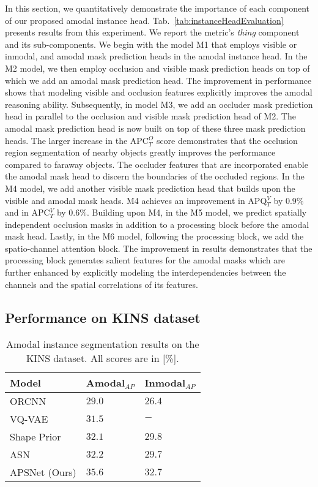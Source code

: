 \documentclass[10pt,twocolumn,letterpaper]{article}
\newcommand{\tabref}[1]{Tab.~\ref{#1}}
\begin{document}
In this section, we quantitatively demonstrate the importance of each component of our proposed amodal instance head. \tabref{tab:instanceHeadEvaluation} presents results from this experiment. We report the metric's \textit{thing} component and its sub-components. We begin with the model M1 that employs visible or inmodal, and amodal mask prediction heads in the amodal instance head. In the M2 model, we then employ occlusion and visible mask prediction heads on top of which we add an amodal mask prediction head. The improvement in performance shows that modeling visible and occlusion features explicitly improves the amodal reasoning ability. Subsequently, in model M3, we add an occluder mask prediction head in parallel to the occlusion and visible mask prediction head of M2. The amodal mask prediction head is now built on top of these three mask prediction heads. The larger increase in the APC$^O_T$ score demonstrates that the occlusion region segmentation of nearby objects greatly improves the performance compared to faraway objects. The occluder features that are incorporated enable the amodal mask head to discern the boundaries of the occluded regions. In the M4 model, we add another visible mask prediction head that builds upon the visible and amodal mask heads. M4 achieves an improvement in APQ$^V_T$ by $0.9\%$ and in APC$^V_T$ by $0.6\%$. Building upon M4, in the M5 model, we predict spatially independent occlusion masks in addition to a processing block before the amodal mask head. Lastly, in the M6 model, following the processing block, we add the spatio-channel attention block. The improvement in results demonstrates that the processing block generates salient features for the amodal masks which are further enhanced by explicitly modeling the interdependencies between the channels and the spatial correlations of its features.

\subsection{Performance on KINS dataset}\label{sec:kins}
\begin{table}
\footnotesize 
\centering
\begin{tabular}{p{2.5cm}|p{1.2cm}p{1.2cm}}
\toprule
Model &  Amodal$_{AP}$ & Inmodal$_{AP}$ \\
\midrule
ORCNN~\cite{follmann2019learning}  & $29.0$ &$26.4$  \\
VQ-VAE~\cite{jang2020learning}  & $31.5$ &$-$  \\
Shape Prior~\cite{yuting2021amodal}  & $32.1$ &$29.8$  \\
ASN~\cite{qi2019amodal}  & $32.2$ &$29.7$   \\
\midrule
\mbox{APSNet} (Ours)  & $\mathbf{35.6}$  & $\mathbf{32.7}$ \\
\bottomrule
\end{tabular}
\vspace{-0.2cm}
\caption{Amodal instance segmentation results on the KINS dataset. All scores are in [\%].}
\label{tab:kins}
\vspace{-0.4cm}
\end{table}
\end{document}
